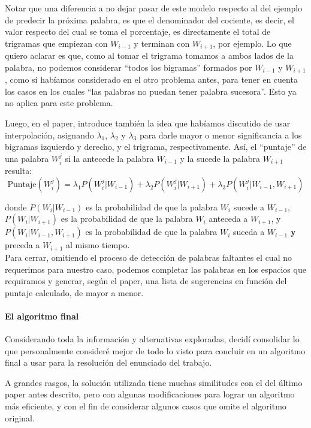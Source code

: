 \documentclass[a4paper]{article}
\begin{document}
Notar que una diferencia a no dejar pasar de este modelo respecto al del ejemplo de predecir la próxima palabra, es que el denominador del cociente, es decir, el valor respecto del cual se toma el porcentaje, es directamente el total de trigramas que empiezan con $W_{i-1}$ y terminan con $W_{i+1}$, por ejemplo. Lo que quiero aclarar es que, como al tomar el trigrama tomamos a ambos lados de la palabra, no podemos considerar ``todos los bigramas'' formados por $W_{i-1}$ y $W_{i+1}$, como sí habíamos considerado en el otro problema antes, para tener en cuenta los casos en los cuales ``las palabras no puedan tener palabra sucesora''. Esto ya no aplica para este problema.

Luego, en el paper, introduce también la idea que habíamos discutido de usar interpolación, asignando $\lambda_1$, $\lambda_2$ y $\lambda_3$ para darle mayor o menor significancia a los bigramas izquierdo y derecho, y el trigrama, respectivamente. Así, el ``puntaje'' de una palabra $W_i^j$ si la antecede la palabra $W_{i-1}$ y la sucede la palabra $W_{i+1}$ resulta:
\[
    \text{Puntaje}(W_i^j) = \lambda_1 P(W_i^j|W_{i-1}) + \lambda_2 P(W_i^j|W_{i+1}) + \lambda_3 P(W_i^j|W_{i-1},W_{i+1})
\]

\noindent donde $P(W_i|W_{i-1})$ es la probabilidad de que la palabra $W_i$ sucede a $W_{i-1}$, $P(W_i|W_{i+1})$ es la probabilidad de que la palabra $W_i$ anteceda a $W_{i+1}$, y $P(W_i|W_{i-1},W_{i+1})$ es la probabilidad de que la palabra $W_i$ suceda a $W_{i-1}$ \textbf{y} preceda a $W_{i+1}$ al mismo tiempo. \\

Para cerrar, omitiendo el proceso de detección de palabras faltantes el cual no requerimos para nuestro caso, podemos completar las palabras en los espacios que requiramos y generar, según el paper, una lista de sugerencias en función del puntaje calculado, de mayor a menor.

\paragraph{El algoritmo final}

Considerando toda la información y alternativas exploradas, decidí consolidar lo que personalmente consideré mejor de todo lo visto para concluir en un algoritmo final a usar para la resolución del enunciado del trabajo.

A grandes rasgos, la solución utilizada tiene muchas similitudes con el del último paper antes descrito, pero con algunas modificaciones para lograr un algoritmo más eficiente, y con el fin de considerar algunos casos que omite el algoritmo original. \\
\end{document}
